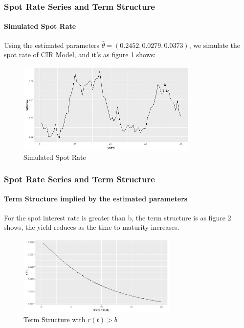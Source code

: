 \documentclass[11pt]{beamer}
\begin{document}
	
	\begin{frame}
		\frametitle{Spot Rate Series and Term Structure}
		\framesubtitle{Simulated Spot Rate}
		Using the estimated parameters $ \hat{\theta}=(0.2452, 0.0279, 0.0373) $, we simulate the spot rate of CIR Model, and it's as figure 1 shows:
		
		\begin{figure}[H]
			\centering
			\includegraphics[height=0.4\textwidth,width=0.8\textwidth]{figure1}
			\caption{Simulated Spot Rate}
			\label{fige1}
		\end{figure}
	\end{frame}
	
	
	\begin{frame}
		\frametitle{Spot Rate Series and Term Structure}
		\framesubtitle{Term Structure implied by the estimated parameters}
		For the spot interest rate is greater than b, the term structure is as figure 2 shows, the yield reduces as the time to maturity increases.
		\begin{figure}[H]
			\centering
			\includegraphics[height=0.4\textwidth,width=0.7\textwidth]{figure2}
			\caption{Term Structure with $ r(t)>b $}
			\label{fige2}
		\end{figure}
	\end{frame}
	
\end{document}

